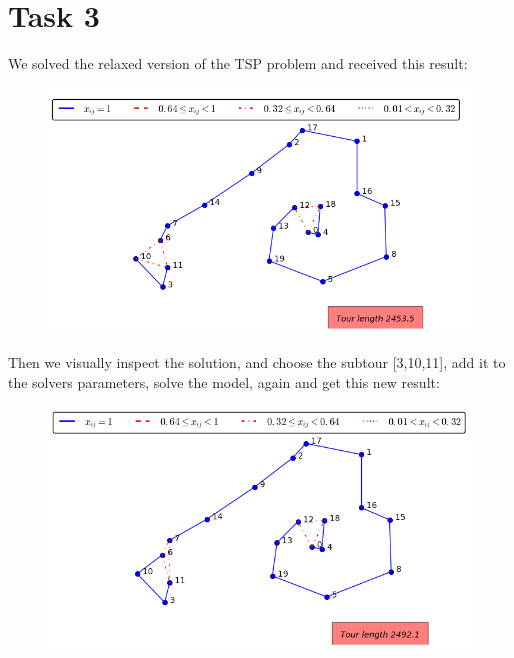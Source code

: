 \documentclass[a4paper,10pt]{article}
\begin{document}
\section*{Task 3}
We solved the relaxed version of the TSP problem and received this result:

\begin{figure}[htb]
\begin{center}
\includegraphics[scale=0.7]{task31.png}
\end{center}
\end{figure}

Then we visually inspect the solution, and choose the subtour [3,10,11], add it to the solvers parameters, solve the model, again and get this new result:

\begin{figure}[htb]
\begin{center}
\includegraphics[scale=0.7]{task32.png}
\end{center}
\end{figure}
\end{document}
